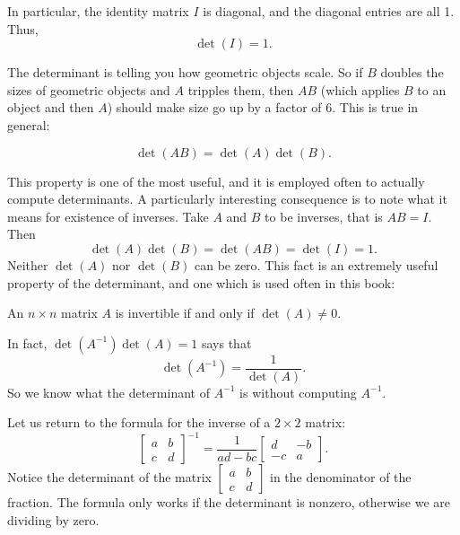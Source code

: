 In particular, the identity matrix $I$ is diagonal, and the diagonal entries
are all 1.  Thus,
\begin{equation*}
\det(I) = 1 .
\end{equation*}

\medskip

The determinant is telling you how geometric objects scale.
So if $B$ doubles the sizes of geometric objects and $A$ tripples them,
then $AB$ (which applies $B$ to an object and then $A$) should make size
go up by a factor of $6$.  This is true in general:

\begin{theorem}
\begin{equation*}
\det(AB) = \det(A)\det(B) .
\end{equation*}
\end{theorem}

This property is one of the most useful, and it is employed often to 
actually compute determinants.  A particularly interesting consequence is to
note what it means for existence of inverses.
Take $A$ and $B$ to be inverses, that is $AB=I$.  Then
\begin{equation*}
\det(A)\det(B) = \det(AB) = \det(I) = 1 .
\end{equation*}
Neither $\det(A)$ nor $\det(B)$ can be zero.
This fact is an extremely useful property of the determinant, and one
which is used often in this book:

\begin{theorem}
An $n \times n$ matrix $A$ is invertible if and only if $\det (A) \not= 0$.
\end{theorem}

In fact, $\det(A^{-1}) \det(A) = 1$ says that
\begin{equation*}
\det(A^{-1}) =
\frac{1}{\det(A)}.
\end{equation*}
So we know what the determinant of $A^{-1}$ is
without computing $A^{-1}$.

Let us return to the formula for the inverse of a $2 \times 2$ matrix:
\begin{equation*}
\begin{bmatrix}
a & b \\
c & d
\end{bmatrix}^{-1}
=
\frac{1}{ad-bc}
\begin{bmatrix}
d & -b \\
-c & a
\end{bmatrix} .
\end{equation*}
Notice the determinant of the matrix
$[\begin{smallmatrix}a&b\\c&d\end{smallmatrix}]$
in the denominator of the fraction.
The formula only works if the determinant is nonzero, otherwise we are
dividing by zero.

